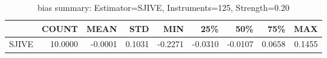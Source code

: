 \begin{table}[ht]
\centering
\caption{bias summary: Estimator=SJIVE, Instruments=125, Strength=0.20}
\begin{tabular}{lrrrrrrrr}
\toprule
 & COUNT & MEAN & STD & MIN & 25\% & 50\% & 75\% & MAX \\
\midrule
SJIVE & 10.0000 & -0.0001 & 0.1031 & -0.2271 & -0.0310 & -0.0107 & 0.0658 & 0.1455 \\
\bottomrule
\end{tabular}
\end{table}
